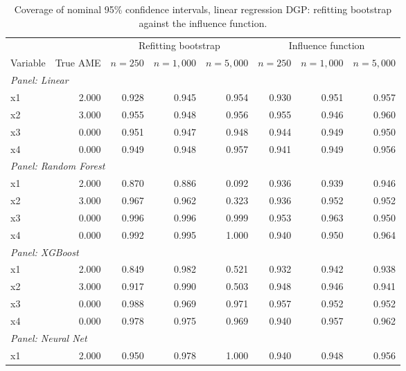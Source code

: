\documentclass[12pt]{article}
\begin{document}
	\begin{table}[htbp]
		\centering
		\small
		\begin{threeparttable}
			\caption{Coverage of nominal 95\% confidence intervals, linear regression DGP: refitting bootstrap against the influence function.}
			\label{tab:sim3_coverage_regression_linear}
			\begin{tabular}{lrrrrrrr}
				\toprule
				& & \multicolumn{3}{c}{Refitting bootstrap} & \multicolumn{3}{c}{Influence function} \\
				\cmidrule(lr){3-5} \cmidrule(lr){6-8}
				Variable & True AME & $n=250$ & $n=1,000$ & $n=5,000$ & $n=250$ & $n=1,000$ & $n=5,000$ \\
				\midrule
				\multicolumn{8}{l}{\textit{Panel: Linear}} \\
				\quad x1 & 2.000 & 0.928 & 0.945 & 0.954 & 0.930 & 0.951 & 0.957 \\
				\quad x2 & 3.000 & 0.955 & 0.948 & 0.956 & 0.955 & 0.946 & 0.960 \\
				\quad x3 & 0.000 & 0.951 & 0.947 & 0.948 & 0.944 & 0.949 & 0.950 \\
				\quad x4 & 0.000 & 0.949 & 0.948 & 0.957 & 0.941 & 0.949 & 0.956 \\
				\midrule
				\multicolumn{8}{l}{\textit{Panel: Random Forest}} \\
				\quad x1 & 2.000 & 0.870 & 0.886 & 0.092 & 0.936 & 0.939 & 0.946 \\
				\quad x2 & 3.000 & 0.967 & 0.962 & 0.323 & 0.936 & 0.952 & 0.952 \\
				\quad x3 & 0.000 & 0.996 & 0.996 & 0.999 & 0.953 & 0.963 & 0.950 \\
				\quad x4 & 0.000 & 0.992 & 0.995 & 1.000 & 0.940 & 0.950 & 0.964 \\
				\midrule
				\multicolumn{8}{l}{\textit{Panel: XGBoost}} \\
				\quad x1 & 2.000 & 0.849 & 0.982 & 0.521 & 0.932 & 0.942 & 0.938 \\
				\quad x2 & 3.000 & 0.917 & 0.990 & 0.503 & 0.948 & 0.946 & 0.941 \\
				\quad x3 & 0.000 & 0.988 & 0.969 & 0.971 & 0.957 & 0.952 & 0.952 \\
				\quad x4 & 0.000 & 0.978 & 0.975 & 0.969 & 0.940 & 0.957 & 0.962 \\
				\midrule
				\multicolumn{8}{l}{\textit{Panel: Neural Net}} \\
				\quad x1 & 2.000 & 0.950 & 0.978 & 1.000 & 0.940 & 0.948 & 0.956 \\

\end{tabular}
\end{threeparttable}
\end{table}
\end{document}
